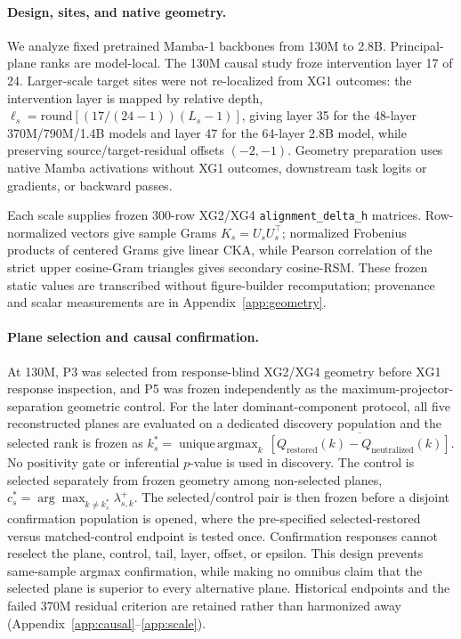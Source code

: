 \documentclass{article}
\begin{document}
\paragraph{Design, sites, and native geometry.}
We analyze fixed pretrained Mamba-1 backbones from 130M to 2.8B. Principal-plane ranks are model-local. The 130M causal study froze intervention layer 17 of 24. Larger-scale target sites were not re-localized from XG1 outcomes: the intervention layer is mapped by relative depth,
$\ell_s=\mathrm{round}[(17/(24-1))(L_s-1)]$,
giving layer 35 for the 48-layer 370M/790M/1.4B models and layer 47 for the 64-layer 2.8B model, while preserving source/target-residual offsets $(-2,-1)$. Geometry preparation uses native Mamba activations without XG1 outcomes, downstream task logits or gradients, or backward passes.

Each scale supplies frozen 300-row XG2/XG4 \texttt{alignment\_delta\_h} matrices. Row-normalized vectors give sample Grams $K_s=U_sU_s^\top$; normalized Frobenius products of centered Grams give linear CKA, while Pearson correlation of the strict upper cosine-Gram triangles gives secondary cosine-RSM. These frozen static values are transcribed without figure-builder recomputation; provenance and scalar measurements are in Appendix~\ref{app:geometry}.

\paragraph{Plane selection and causal confirmation.}
At 130M, P3 was selected from response-blind XG2/XG4 geometry before XG1 response inspection, and P5 was frozen independently as the maximum-projector-separation geometric control. For the later dominant-component protocol, all five reconstructed planes are evaluated on a dedicated discovery population and the selected rank is frozen as
$k_s^*=\operatorname{unique\,argmax}_k\,\overline{[Q_{\mathrm{restored}}(k)-Q_{\mathrm{neutralized}}(k)]}$.
No positivity gate or inferential $p$-value is used in discovery. The control is selected separately from frozen geometry among non-selected planes,
$c_s^*=\arg\max_{k\neq k_s^*}\lambda_{s,k}^{+}$.
The selected/control pair is then frozen before a disjoint confirmation population is opened, where the pre-specified selected-restored versus matched-control endpoint is tested once. Confirmation responses cannot reselect the plane, control, tail, layer, offset, or epsilon. This design prevents same-sample argmax confirmation, while making no omnibus claim that the selected plane is superior to every alternative plane. Historical endpoints and the failed 370M residual criterion are retained rather than harmonized away (Appendix~\ref{app:causal}--\ref{app:scale}).
\end{document}
